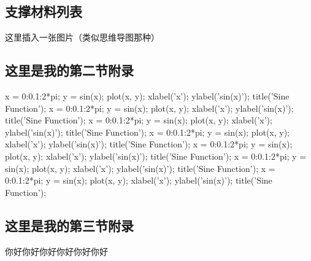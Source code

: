 \documentclass[zihao=5, UTF8]{article}
\theoremstyle{MyLineTheoremStyle} %
\theoremstyle{MyBlockTheoremStyle} %
\theoremstyle{MySubsubsectionStyle} %
\begin{document}
\subsection{支撑材料列表} 

\begin{center}
  这里插入一张图片（类似思维导图那种）
\end{center}
\subsection{这里是我的第二节附录}

\begin{matlablisting}
x = 0:0.1:2*pi;
y = sin(x);
plot(x, y);
xlabel('x');
ylabel('sin(x)');
title('Sine Function');
x = 0:0.1:2*pi;
y = sin(x);
plot(x, y);
xlabel('x');
ylabel('sin(x)');
title('Sine Function');
x = 0:0.1:2*pi;
y = sin(x);
plot(x, y);
xlabel('x');
ylabel('sin(x)');
title('Sine Function');
x = 0:0.1:2*pi;
y = sin(x);
plot(x, y);
xlabel('x');
ylabel('sin(x)');
title('Sine Function');
x = 0:0.1:2*pi;
y = sin(x);
plot(x, y);
xlabel('x');
ylabel('sin(x)');
title('Sine Function');
x = 0:0.1:2*pi;
y = sin(x);
plot(x, y);
xlabel('x');
ylabel('sin(x)');
title('Sine Function');
x = 0:0.1:2*pi;
y = sin(x);
plot(x, y);
xlabel('x');
ylabel('sin(x)');
title('Sine Function');
\end{matlablisting}

\subsection{这里是我的第三节附录}
你好你好你好你好你好你好
\end{document}
